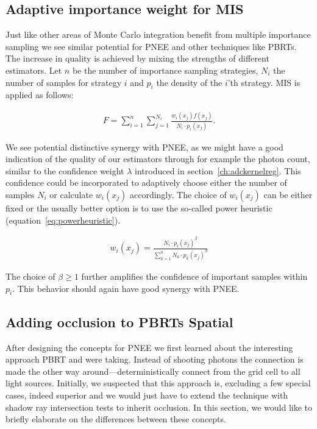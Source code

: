 \subsection{Adaptive importance weight for MIS}

Just like other areas of Monte Carlo integration benefit from multiple importance sampling we see similar potential for PNEE and other techniques like PBRTs. The increase in quality is achieved by mixing the strengths of different estimators. Let $n$ be the number of importance sampling strategies, $N_i$ the number of samples for strategy $i$ and $p_i$ the density of the $i$'th strategy. MIS is applied as follows:

\begin{align}
F = \sum_{i=1}^{n}\sum_{j=1}^{N_i}\frac{w_i(x_j)f(x_j)}{N_i \cdot p_i(x_j)}.
\label{eq:mis}
\end{align}

We see potential distinctive synergy with PNEE, as we might have a good indication of the quality of our estimators through for example the photon count, similar to the confidence weight $\lambda$ introduced in section~\ref{ch:adckernelreg}. This confidence could be incorporated to adaptively choose either the number of samples $N_i$ or calculate $w_i(x_j)$ accordingly. The choice of $w_i(x_j)$ can be either fixed or the usually better option is to use the so-called power heuristic (equation~\ref{eq:powerheuristic})\parencite{veach1997robust}. 

\begin{align}
w_i(x_j) = \frac{N_i \cdot p_i(x_j)^\beta}{\sum_{k=1}^{n} N_k \cdot p_k(x_j)^\beta}
\label{eq:powerheuristic}
\end{align}

The choice of $\beta \geq 1$ further amplifies the confidence of important samples within $p_i$. This behavior should again have good synergy with PNEE.


\subsection{Adding occlusion to PBRTs Spatial}
\label{sec:pbrtoccl}

After designing the concepts for PNEE we first learned about the interesting approach PBRT and \textcite{Vevoda} were taking. Instead of shooting photons the connection is made the other way around---deterministically connect from the grid cell to all light sources. Initially, we suspected that this approach is, excluding a few special cases, indeed superior and we would just have to extend the technique with shadow ray intersection tests to inherit occlusion. In this section, we would like to briefly elaborate on the differences between these concepts.

